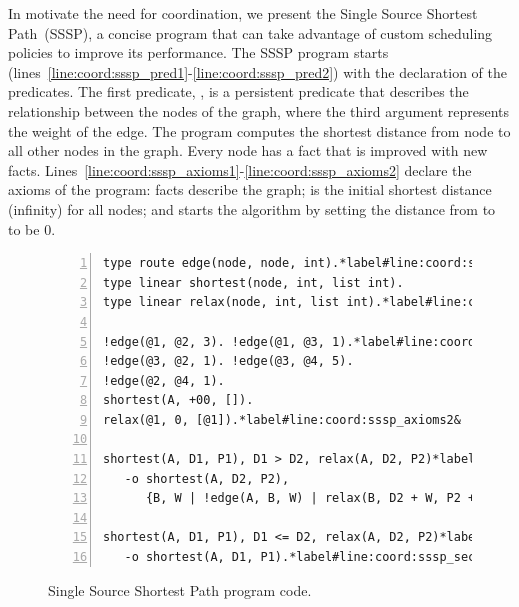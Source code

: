In motivate the need for coordination, we present the Single Source Shortest
Path~(SSSP), a concise program that can take advantage of custom scheduling
policies to improve its performance. The SSSP program starts
(lines~\ref{line:coord:sssp_pred1}-\ref{line:coord:sssp_pred2}) with the
declaration of the predicates. The first predicate, , is a persistent
predicate that describes the relationship between the nodes of the graph, where
the third argument represents the weight of the edge.  The program computes the
shortest distance from node  to all other nodes in the graph. Every
node has a  fact that is improved with new  facts.
Lines~\ref{line:coord:sssp_axioms1}-\ref{line:coord:sssp_axioms2} declare the
axioms of the program:  facts describe the graph;  is the initial shortest distance (infinity) for all nodes; and
 starts the algorithm by setting the distance from
 to  to be 0.

\begin{figure}[ht]
\begin{Verbatim}[numbers=left,fontsize=\codesize,commandchars=\*\#\&]
type route edge(node, node, int).*label#line:coord:sssp_pred1&
type linear shortest(node, int, list int).
type linear relax(node, int, list int).*label#line:coord:sssp_pred2&

!edge(@1, @2, 3). !edge(@1, @3, 1).*label#line:coord:sssp_axioms1&
!edge(@3, @2, 1). !edge(@3, @4, 5).
!edge(@2, @4, 1).
shortest(A, +00, []).
relax(@1, 0, [@1]).*label#line:coord:sssp_axioms2&

shortest(A, D1, P1), D1 > D2, relax(A, D2, P2)*label#line:coord:sssp_first1&
   -o shortest(A, D2, P2),
      {B, W | !edge(A, B, W) | relax(B, D2 + W, P2 ++ [B])}.*label#line:coord:sssp_first2&

shortest(A, D1, P1), D1 <= D2, relax(A, D2, P2)*label#line:coord:sssp_second1&
   -o shortest(A, D1, P1).*label#line:coord:sssp_second2&
\end{Verbatim}
\caption{Single Source Shortest Path program code.}
\label{code:shortest_path_program}
\end{figure}

